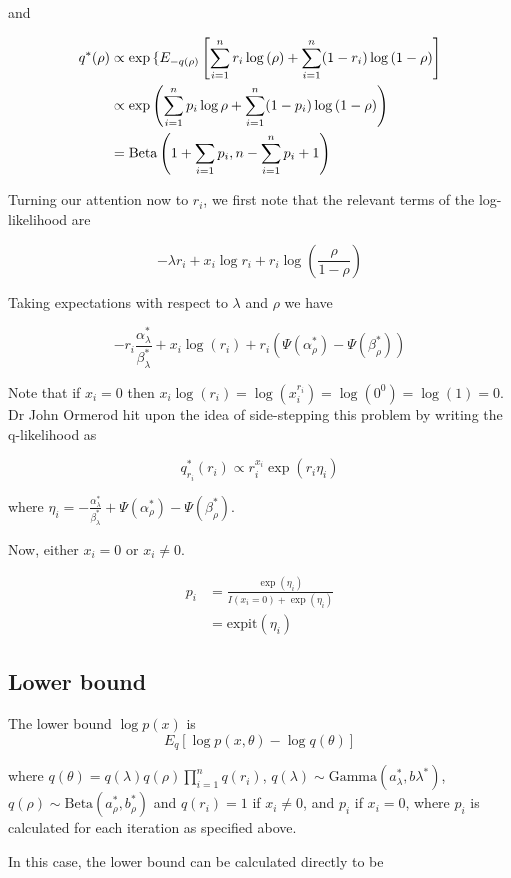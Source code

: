 \documentclass{amsart}
\begin{document}
and

\begin{align*}
q^*(\rho) &\propto \exp{\{ E_{-q(\rho)} \left[ \sum_{i=1}^n r_i \log{(\rho)} + \sum_{i=1}^n (1- r_i) \log{(1 - \rho)} \right] } \\
&\propto \exp{ \left( \sum_{i=1}^n p_i \log{\rho} + \sum_{i=1}^n (1 - p_i) \log{(1 - \rho)} \right) } \\
&= \text{Beta} \left( 1+ \sum_{i=1} p_i, n - \sum_{i=1}^n p_i + 1 \right)
\end{align*}

Turning our attention now to $r_i$, we first note that the relevant terms of the
log-likelihood are

$$
-\lambda r_i + x_i \log{r_i} + r_i \log{\left(\frac{\rho}{1 - \rho}\right)}
$$

Taking expectations with respect to $\lambda$ and $\rho$ we have

$$
-r_i \frac{\alpha_\lambda^*}{\beta_\lambda^*} + x_i \log{(r_i)} + r_i (\Psi(\alpha_\rho^*) - \Psi(\beta_\rho^*))
$$

Note that if $x_i = 0$ then
$x_i \log{(r_i)} = \log{(x_i^{r_i})} = \log{(0^0)} = \log{(1)} = 0$. Dr John Ormerod hit
upon the idea of side-stepping this problem by writing the q-likelihood as

$$
q_{r_i}^*(r_i) \propto r_i^{x_i} \exp{(r_i \eta_i)}
$$

where $\eta_i = - \frac{\alpha_\lambda^*}{\beta_\lambda^*} + \Psi(\alpha_\rho^*) - \Psi(\beta_\rho^*)$.

Now, either $x_i = 0$ or $x_i \ne 0$.

\begin{align*}
p_i &= \frac{\exp{(\eta_i)}}{I(x_i = 0) + \exp{(\eta_i)}} \\
&= \text{expit}(\eta_i)
\end{align*}

\subsection{Lower bound}
The lower bound $\log{p(x)}$ is
$$
	E_q[\log{p(x, \theta)} - \log{q(\theta)}]
$$

where $q(\theta) = q(\lambda) q(\rho) \prod_{i=1}^n q(r_i)$,
$q(\lambda) \sim \text{Gamma}{(a_\lambda^*, b\lambda^*)}$,
$q(\rho) \sim \text{Beta}(a_\rho^*, b_\rho^*)$ and
$q(r_i) = 1$ if $x_i \ne 0$, and $p_i$ if $x_i = 0$, where $p_i$ is
calculated for each iteration as specified above.

In this case, the lower bound can be calculated directly to be
\end{document}
